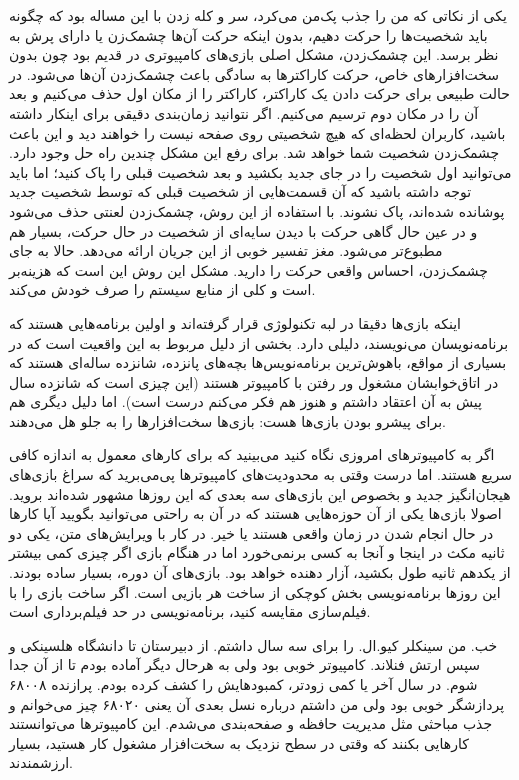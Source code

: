 یکی از نکاتی که من را جذب پک‌من می‌کرد، سر و کله زدن با این مساله بود که
چگونه باید شخصیت‌ها را حرکت دهیم، بدون اینکه حرکت آن‌ها چشمک‌زن یا دارای
پرش به نظر برسد. این چشمک‌زدن، مشکل اصلی بازی‌های کامپیوتری در قدیم بود
چون بدون سخت‌افزارهای خاص، حرکت کاراکترها به سادگی باعث چشمک‌زدن آن‌ها
می‌شود. در حالت طبیعی برای حرکت دادن یک کاراکتر، کاراکتر را از مکان اول
حذف می‌کنیم و بعد آن را در مکان دوم ترسیم می‌کنیم. اگر نتوانید زمان‌بندی
دقیقی برای اینکار داشته باشید، کاربران لحظه‌ای که هیچ شخصیتی روی صفحه
نیست را خواهند دید و این باعث چشمک‌زدن شخصیت شما خواهد شد. برای رفع این
مشکل چندین راه حل وجود دارد. می‌توانید اول شخصیت را در جای جدید بکشید و
بعد شخصیت قبلی را پاک کنید؛ اما باید توجه داشته باشید که آن قسمت‌هایی
از شخصیت قبلی که توسط شخصیت جدید پوشانده شده‌اند، پاک نشوند. با استفاده
از این روش، چشمک‌زدن لعنتی حذف می‌شود و در عین حال گاهی حرکت با دیدن
سایه‌ای از شخصیت در حال حرکت، بسیار هم مطبوع‌تر می‌شود. مغز تفسیر خوبی از
این جریان ارائه می‌دهد. حالا به جای چشمک‌زدن، احساس واقعی حرکت را
دارید. مشکل این روش این است که هزینه‌بر است و کلی از منابع سیستم را صرف
خودش می‌کند.

اینکه بازی‌ها دقیقا در لبه تکنولوژی قرار گرفته‌اند و اولین برنامه‌هایی
هستند که برنامه‌نویسان می‌نویسند، دلیلی دارد. بخشی از دلیل مربوط به این
واقعیت است که در بسیاری از مواقع، باهوش‌ترین برنامه‌نویس‌ها بچه‌های
پانزده، شانزده‌ ساله‌ای هستند که در اتاق‌خوابشان مشغول ور رفتن با
کامپیوتر هستند (این چیزی است که شانزده سال پیش به آن اعتقاد داشتم و
هنوز هم فکر می‌کنم درست است). اما دلیل دیگری هم برای پیشرو بودن بازی‌ها
هست: بازی‌ها سخت‌افزارها را به جلو هل می‌دهند.

اگر به کامپیوترهای امروزی نگاه کنید می‌بینید که برای کارهای معمول به
اندازه کافی سریع هستند. اما درست وقتی به محدودیت‌های کامپیوترها
پی‌می‌برید که سراغ بازی‌های هیجان‌انگیز جدید و بخصوص این بازی‌های سه بعدی
که این روزها مشهور شده‌اند بروید. اصولا بازی‌ها یکی از آن حوزه‌هایی هستند
که در آن به راحتی می‌توانید بگویید آیا کارها در حال انجام شدن در زمان
واقعی هستند یا خیر. در کار با ویرایش‌های متن، یکی دو ثانیه مکث در اینجا
و آنجا به کسی برنمی‌خورد اما در هنگام بازی اگر چیزی کمی بیشتر از یکدهم
ثانیه طول بکشید، آزار دهنده خواهد بود. بازی‌های آن دوره، بسیار ساده
بودند. این روزها برنامه‌نویسی بخش کوچکی از ساخت هر بازیی است. اگر ساخت
بازی را با فیلم‌سازی مقایسه کنید، برنامه‌نویسی در حد فیلم‌برداری است.

خب. من سینکلر کیو.ال. را برای سه سال داشتم. از دبیرستان تا دانشگاه
هلسینکی و سپس ارتش فنلاند. کامپیوتر خوبی بود ولی به هرحال دیگر آماده
بودم تا از آن جدا شوم. در سال آخر یا کمی زودتر، کمبودهایش را کشف کرده
بودم. پرازنده ۶۸۰۰۸ پردازشگر خوبی بود ولی من داشتم درباره نسل بعدی آن
یعنی ۶۸۰۲۰ چیز می‌خوانم و جذب مباحثی مثل مدیریت حافظه و صفحه‌بندی
می‌شدم. این کامپیوترها می‌توانستند کارهایی بکنند که وقتی در سطح نزدیک به
سخت‌افزار مشغول کار هستید، بسیار ارزشمندند.

